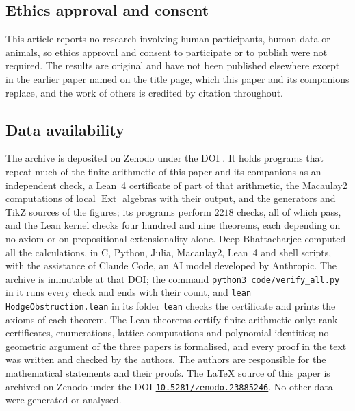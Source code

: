 \documentclass[11pt,reqno]{amsart}
\theoremstyle{plain}
\theoremstyle{definition}
\theoremstyle{remark}
\DeclareMathOperator{\Ext}{Ext}
\begin{document}
\subsection*{Ethics approval and consent}
This article reports no research involving human participants, human data or
animals, so ethics approval and consent to participate or to publish were not
required. The results are original and have not been published elsewhere
except in the earlier paper named on the title page, which this paper and its
companions replace, and the work of others is credited by citation throughout.

\subsection*{Data availability}
The archive \cite{BMB26} is deposited on Zenodo under the DOI
\zenodoCodeDOI. It holds programs that repeat much of the finite arithmetic of this paper and its companions \cite{paperI,paperII}
as an independent check, a Lean~4 certificate of part of that arithmetic, the
Macaulay2 computations of local $\Ext$ algebras with their output, and the
generators and TikZ sources of the figures; its programs perform $2218$
checks, all of which pass, and the Lean kernel checks four hundred and nine
theorems, each depending on no axiom or on propositional extensionality
alone. Deep Bhattacharjee computed all the calculations, in C, Python, Julia,
Macaulay2, Lean~4 and shell scripts, with the assistance of Claude Code, an
AI model developed by Anthropic. The archive is immutable at that DOI;
the command \texttt{python3 code/verify\_all.py} in it runs every check and
ends with their count, and \texttt{lean HodgeObstruction.lean} in its folder
\texttt{lean} checks the certificate and prints the axioms of each theorem.
The Lean theorems certify finite arithmetic only: rank certificates,
enumerations, lattice computations and polynomial identities; no geometric
argument of the three papers is formalised, and every proof in the text was
written and checked by the authors. The authors are responsible for the
mathematical statements and their proofs. The \LaTeX{} source of this paper is
archived on Zenodo under the DOI \href{https://doi.org/10.5281/zenodo.23885246}{\texttt{10.5281/zenodo.23885246}}.
No other data were generated or analysed.
\end{document}
